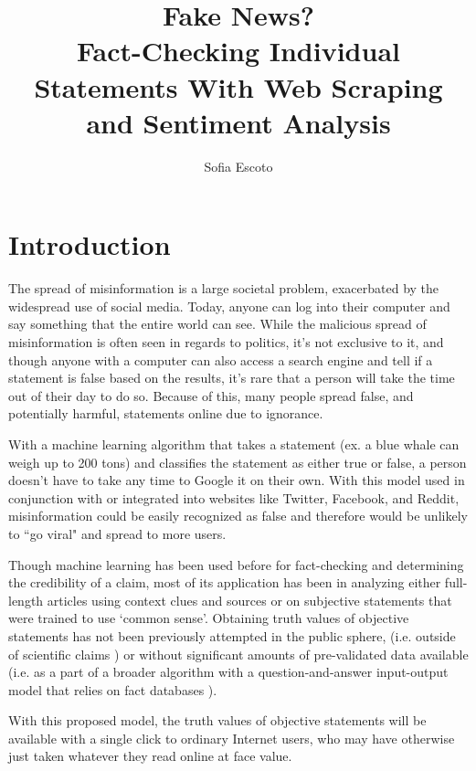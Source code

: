 \documentclass[]{article}
\title{Fake News?
	\\ \vspace{2mm} \smaller[2]{}Fact-Checking Individual Statements With Web Scraping and Sentiment Analysis}
\author{Sofia Escoto}
\begin{document}
	\maketitle
	
	\section{Introduction}
		
		
		The spread of misinformation is a large societal problem, exacerbated by the widespread use of social media. Today, anyone can log into their computer and say something that the entire world can see. While the malicious spread of misinformation is  often seen in regards to politics, it's not exclusive to it, and though anyone with a computer can also access a search engine and tell if a statement is false based on the results, it's rare that a person will take the time out of their day to do so. Because of this, many people spread false, and potentially harmful, statements online due to ignorance.
		
		With a machine learning algorithm that takes a statement (ex. a blue whale can weigh up to 200 tons) and classifies the statement as either true or false, a person doesn't have to take any time to Google it on their own. With this model used in conjunction with or integrated into websites like Twitter, Facebook, and Reddit, misinformation could be easily recognized as false and therefore would be unlikely to ``go viral" and spread to more users. 
		
		Though machine learning has been used before for fact-checking and determining the credibility of a claim, most of its application has been in analyzing either full-length articles using context clues and sources or on subjective statements that were trained to use `common sense'. Obtaining truth values of objective statements has not been previously attempted in the public sphere, (i.e. outside of scientific claims \cite{wadden20}) or without significant amounts of pre-validated data available (i.e. as a part of a broader algorithm with a question-and-answer input-output model that relies on fact databases \cite{lazarski21}).
		
		 With this proposed model, the truth values of objective statements will be available with a single click to ordinary Internet users, who may have otherwise just taken whatever they read online at face value.
		
\end{document}
